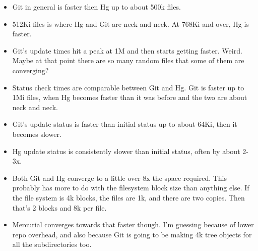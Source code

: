 \documentclass[a4paper]{article}
\begin{document}
\begin{itemize}

    \item Git in general is faster then Hg up to about 500k files.

    \item 512Ki files is where Hg and Git are neck and neck. At 768Ki and over,
        Hg is faster.

    \item Git's update times hit a peak at 1M and then starts getting faster.
        Weird. Maybe at that point there are so many random files that some of
        them are converging?

\item Status check times are comparable between Git and Hg. Git is faster up to
    1Mi files, when Hg becomes faster than it was before and the two are about
    neck and neck.

\item Git's update status is faster than initial status up to about 64Ki, then
    it becomes slower.

\item Hg update status is consistently slower than initial status, often by
    about 2-3x.

\item Both Git and Hg converge to a little over 8x the space required. This
    probably has more to do with the filesystem block size than anything else.
    If the file system is 4k blocks, the files are 1k, and there are two copies.
    Then that's 2 blocks and 8k per file.

\item Mercurial converges towards that faster though. I'm guessing because of
    lower repo overhead, and also because Git is going to be making 4k tree
    objects for all the subdirectories too.

\end{itemize}
\end{document}
